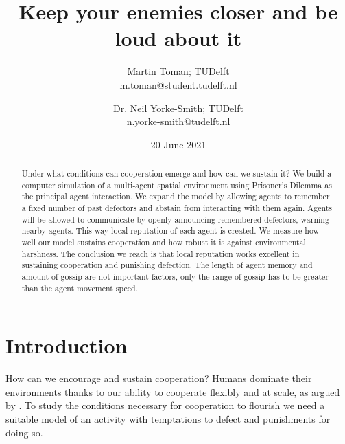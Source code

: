 \documentclass[english]{article}
\begin{document}

\title{Keep your enemies closer and be loud about it}
\author{
  Martin Toman; TUDelft
  \\
  m.toman@student.tudelft.nl
\and
  Dr. Neil Yorke-Smith; TUDelft
  \\
  n.yorke-smith@tudelft.nl
}
\date{20 June 2021}
\maketitle


\begin{abstract}

Under what conditions can cooperation emerge and how can we sustain it?
We build a computer simulation of a multi-agent spatial environment using Prisoner's Dilemma as the principal agent interaction.
We expand the model by allowing agents to remember a fixed number of past defectors
and abstain from interacting with them again.
Agents will be allowed to communicate by openly announcing remembered defectors, warning nearby agents.
This way local reputation of each agent is created.
We measure how well our model sustains cooperation and how robust it is against environmental harshness.
The conclusion we reach is that local reputation works excellent in sustaining cooperation and punishing defection.
The length of agent memory and amount of gossip are not important factors,
only the range of gossip has to be greater than the agent movement speed.

\end{abstract}



\section{Introduction}

How can we encourage and sustain cooperation? Humans dominate their environments thanks to our ability to cooperate flexibly and at scale, as argued by \citet{harari-sapiens}.
To study the conditions necessary for cooperation to flourish we need a suitable model of an activity with temptations to defect and punishments for doing so.
\end{document}
